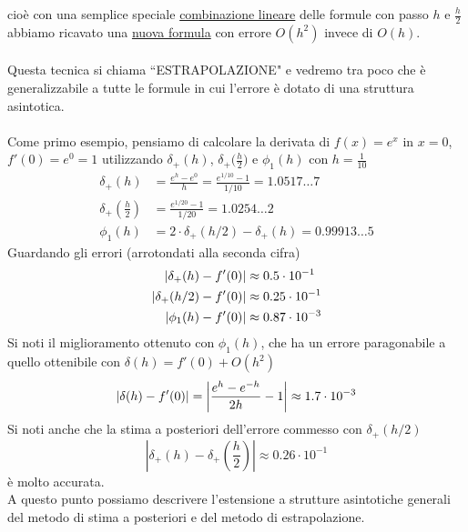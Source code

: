 \documentclass[12pt,a4paper]{article}
\DeclarePairedDelimiter{\abs}{\lvert}{\rvert}
\begin{document}
cioè con una semplice speciale \uline{combinazione lineare} delle formule con passo $h$ e $\frac{h}{2}$ abbiamo ricavato una \uline{nuova formula} con errore $O(h^2)$
invece di $O(h)$.\\
\vspace{0.1cm}\\
Questa tecnica si chiama ``ESTRAPOLAZIONE" e vedremo tra poco che è generalizzabile a tutte le formule in cui l'errore è dotato di una struttura asintotica.\\
\vspace{0.1cm}\\
Come primo esempio, pensiamo di calcolare la derivata di $f(x)=e^x$ in $x=0$, $f'(0)=e^0=1$ utilizzando $\delta_+(h)$, $\delta_+\bigl(\frac{h}{2}\bigr)$ e $\phi_1(h)$ con $h=\frac{1}{10}$
\[
\begin{split}
    \delta_+ (h) & = \frac{e^h - e^0}{h} = \frac{e^{1/10} - 1}{1/10} = 1.0517 \dotso 7 \\
    \delta_+ \left(\frac{h}{2}\right) & = \frac{e^{1/20} - 1}{1/20} = 1.0254 \dotso 2 \\
    \phi_1 (h) & = 2 \cdot \delta_+ (h/2) - \delta_+ (h) = 0.99913 \dotso 5
\end{split}
\]
Guardando gli errori (arrotondati alla seconda cifra)
\[
\begin{split}
    \abs{\delta_+ (h) - f'(0)} & \approx 0.5 \cdot 10^{-1} \\
    \abs{\delta_+ (h/2) - f'(0)} & \approx 0.25 \cdot 10^{-1} \\
    \abs{\phi_1 (h) - f'(0)} & \approx 0.87 \cdot 10^{-3}
\end{split}
\]
Si noti il miglioramento ottenuto con $\phi_1 (h)$, che ha un
errore paragonabile a quello ottenibile con $\delta (h) = f'(0) + O(h^2)$
\[
\abs{\delta (h) - f'(0)} = \left|\frac{e^h - e^{-h}}{2h} - 1 \right| \approx 1.7 \cdot 10^{-3}
\]
Si noti anche che la stima a posteriori dell'errore commesso con $\delta_+ (h/2)$
\[
\left| \delta_+(h) - \delta_+\left(\frac{h}{2}\right) \right| \approx 0.26 \cdot 10^{-1}
\]
è molto accurata.\\
A questo punto possiamo descrivere l'estensione a strutture asintotiche generali del metodo di stima a posteriori e del metodo di estrapolazione.\\
\end{document}
